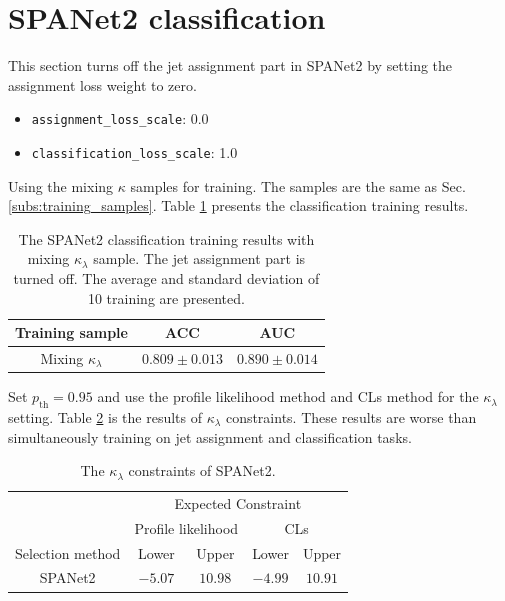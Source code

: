 \documentclass[12pt]{article}
\begin{document}
\section{SPANet2 classification}%
\label{sec:spanet2_classification}
	This section turns off the jet assignment part in SPANet2 by setting the assignment loss weight to zero.
	\begin{itemize}
		\item \verb+assignment_loss_scale+: 0.0
		\item \verb+classification_loss_scale+: 1.0
	\end{itemize}

	Using the mixing $\kappa$ samples for training. The samples are the same as Sec. \ref{subs:training_samples}. Table \ref{tab:SPANET_no_pairing_cls_results} presents the classification training results.
	\begin{table}[htpb]
		\centering
		\caption{The SPANet2 classification training results with mixing $\kappa_\lambda$ sample. The jet assignment part is turned off. The average and standard deviation of 10 training are presented.}
		\label{tab:SPANET_no_pairing_cls_results}
		\begin{tabular}{c|cc}
		Training sample        & ACC     & AUC   \\ \hline
		Mixing $\kappa_\lambda $ & $0.809 \pm 0.013$ & $0.890 \pm 0.014$
		\end{tabular}      
	\end{table}

	Set $p_\text{th} = 0.95$ and use the profile likelihood method and CLs method for the $\kappa_\lambda$ setting. Table \ref{tab:kappa_constraint_SPANet_no_pair} is the results of $\kappa_\lambda$ constraints. These results are worse than simultaneously training on jet assignment and classification tasks.
	\begin{table}[htpb]
		\centering
		\caption{The $\kappa_\lambda$ constraints of SPANet2.}
		\label{tab:kappa_constraint_SPANet_no_pair}
		\begin{tabular}{c|cc|cc}
							  & \multicolumn{4}{c}{Expected Constraint}                          \\
							  & \multicolumn{2}{c}{Profile likelihood} & \multicolumn{2}{c}{CLs} \\ \hline
		Selection method      & Lower              & Upper             & Lower      & Upper      \\ \hline
		SPANet2      & $-5.07$            & $10.98$             & $-4.99$      & $10.91$      \\
		\end{tabular}
	\end{table}
\end{document}
